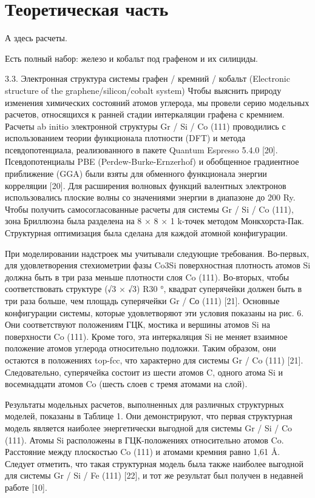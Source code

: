 \section{Теоретическая часть}\label{sec:ch1/sec1}
А здесь расчеты.

Есть полный набор: железо и кобальт под графеном и их силициды.

3.3. Электронная структура системы графен / кремний / кобальт (Electronic structure of the graphene/silicon/cobalt system)
Чтобы выяснить природу изменения химических состояний атомов углерода, мы провели серию модельных расчетов, относящихся к ранней стадии интеркаляции графена с кремнием. Расчеты ab initio электронной структуры Gr / Si / Co (111) проводились с использованием теории функционала плотности (DFT) и метода псевдопотенциала, реализованного в пакете Quantum Espresso 5.4.0 [20]. Псевдопотенциалы PBE (Perdew-Burke-Ernzerhof) и обобщенное градиентное приближение (GGA) были взяты для обменного функционала энергии корреляции [20]. Для расширения волновых функций валентных электронов использовались плоские волны со значениями энергии в диапазоне до 200 Ry. Чтобы получить самосогласованные расчеты для системы Gr / Si / Co (111), зона Бриллюэна была разделена на 8 × 8 × 1 k-точек методом Монкхорста-Пак. Структурная оптимизация была сделана для каждой атомной конфигурации.

При моделировании надстроек мы учитывали следующие требования. Во-первых, для удовлетворения стехиометрии фазы Co3Si поверхностная плотность атомов Si должна быть в три раза меньше плотности слоя Co (111). Во-вторых, чтобы соответствовать структуре (√3 × √3) R30 °, квадрат суперячейки должен быть в три раза больше, чем площадь суперячейки Gr / Со (111) [21]. Основные конфигурации системы, которые удовлетворяют эти условия показаны на рис. 6. Они соответствуют положениям ГЦК, мостика и вершины атомов Si на поверхности Co (111). Кроме того, эта интеркаляция Si не меняет взаимное положение атомов углерода относительно подложки. Таким образом, они остаются в положениях top-fcc, что характерно для системы Gr / Co (111) [21]. Следовательно, суперячейка состоит из шести атомов C, одного атома Si и восемнадцати атомов Co (шесть слоев с тремя атомами на слой).

Результаты модельных расчетов, выполненных для различных структурных моделей, показаны в Таблице 1. Они демонстрируют, что первая структурная модель является наиболее энергетически выгодной для системы Gr / Si / Co (111). Атомы Si расположены в ГЦК-положениях относительно атомов Co. Расстояние между плоскостью Co (111) и атомами кремния равно 1,61 Å. Следует отметить, что такая структурная модель была также наиболее выгодной для системы Gr / Si / Fe (111) [22], и тот же результат был получен в недавней работе [10].

